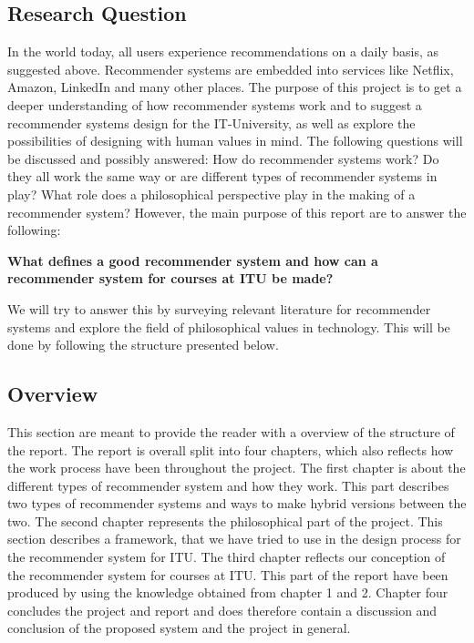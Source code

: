 \subsection*{Research Question}
\label{subsec:researchquestion}
In the world today, all users experience recommendations on a daily basis, as suggested above. Recommender systems are embedded into services like Netflix, Amazon, LinkedIn and many other places. \newline
The purpose of this project is to get a deeper understanding of how recommender systems work and to suggest a recommender systems design for the IT-University, as well as explore the possibilities of designing with human values in mind. \newline
The following questions will be discussed and possibly answered: How do recommender systems work? Do they all work the same way or are different types of recommender systems in play? What role does a philosophical perspective play in the making of a recommender system? However, the main purpose of this report are to answer the following: \newline

\textbf{What defines a good recommender system and how can a recommender system for courses at ITU be made?}\newline

We will try to answer this by surveying relevant literature for recommender systems and explore the field of philosophical values in technology. This will be done by following the structure presented below.

\subsection*{Overview}
This section are meant to provide the reader with a overview of the structure of the report.\newline
The report is overall split into four chapters, which also reflects how the work process have been throughout the project.\newline 
The first chapter is about the different types of recommender system and how they work. This part describes two types of recommender systems and ways to make hybrid versions between the two.\newline
The second chapter represents the philosophical part of the project. This section describes a framework, that we have tried to use in the design process for the recommender system for ITU. \newline
The third chapter reflects our conception of the recommender system for courses at ITU. This part of the report have been produced by using the knowledge obtained from chapter 1 and 2.\newline
Chapter four concludes the project and report and does therefore contain a discussion and conclusion of the proposed system and the project in general.
\newpage